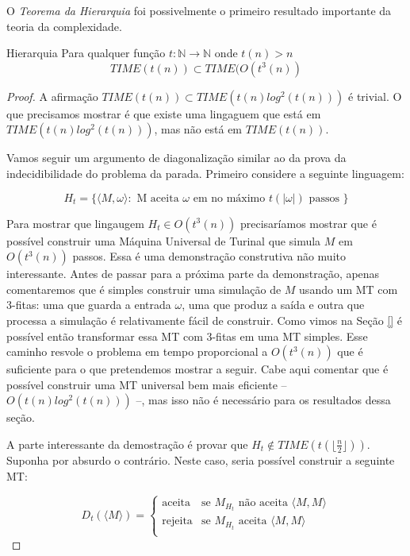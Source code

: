 O {\em Teorema da Hierarquia} foi possivelmente o primeiro resultado importante da teoria da complexidade.

\begin{theorem}{Hierarquia}
  Para qualquer função $t: \mathbb{N} \to \mathbb{N}$ onde $t(n) > n$
  \begin{displaymath}
    TIME(t(n)) \subset TIME(O(t^3(n))
  \end{displaymath}
\end{theorem}
\begin{proof}
  A afirmação $TIME(t(n)) \subset TIME(t(n) log^2(t(n)))$ é trivial.
  O que precisamos mostrar é que existe uma lingaguem que está em $TIME(t(n) log^2(t(n)))$, mas não está em $TIME(t(n))$.
  
  Vamos seguir um argumento de diagonalização similar ao da prova da indecidibilidade do problema da parada.
  Primeiro considere a seguinte linguagem:

  \begin{displaymath}
    H_t = \{ \langle M, \omega \rangle : \textrm{ M aceita $\omega$ em no máximo $t(|\omega|)$ passos }\}
  \end{displaymath}

  Para mostrar que lingaugem $H_t \in O(t^3(n))$ precisaríamos mostrar que é possível construir uma Máquina Universal de Turinal que simula $M$ em $O(t^3(n))$ passos.
  Essa é uma demonstração construtiva não muito interessante.
  Antes de passar para a próxima parte da demonstração, apenas comentaremos que é simples construir uma simulação de $M$ usando um MT com 3-fitas: uma que guarda a entrada $\omega$, uma que produz a saída e outra que processa a simulação é relativamente fácil de construir.
  Como vimos na Seção \ref{} é possível então transformar essa MT com 3-fitas em uma MT simples.
  Esse caminho resvole o problema em tempo proporcional a $O(t^3(n))$ que é suficiente para o que pretendemos mostrar a seguir.
  Cabe aqui comentar que é possível construir uma MT universal bem mais eficiente -- $O(t(n) log^2(t(n)))$ --, mas isso não é necessário para os resultados dessa seção.
  
  A parte interessante da demostração é provar que $H_t \notin TIME(t(\lfloor \frac{n}{2}\rfloor))$.
  Suponha por absurdo o contrário.
  Neste caso, seria possível construir a seguinte MT:

  \begin{displaymath}
    D_t(\langle M \rangle) =  \left\{\begin{array}{cl}
    \textrm{aceita} & \textrm{se $M_{H_t}$ não aceita $\langle M, M \rangle$}\\
    \textrm{rejeita} & \textrm{se $M_{H_t}$ aceita $\langle M, M \rangle$}\\ 
    \end{array}\right.
  \end{displaymath}


\end{proof}
